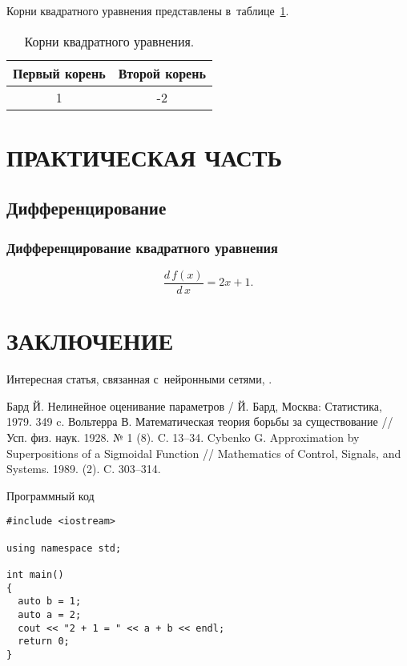 \documentclass[rusmathsym, eqnumwithinsec,amspack, hyperref]{bomgost}
\begin{document}
Корни квадратного уравнения представлены в~таблице~\ref{tab:roots}.
\begin{gosttable}
\begin{table}[H]
\centering
\caption{Корни квадратного уравнения.}
\label{tab:roots}
\begin{tabular}{|c|c|}
\hline 
Первый корень &  Второй корень \\ 
\hline 
1 & -2  \\ 
\hline 
\end{tabular}
\end{table}
\end{gosttable}



\section{ПРАКТИЧЕСКАЯ ЧАСТЬ}
\subsection{Дифференцирование}
\subsubsection{Дифференцирование квадратного уравнения}
\begin{equation}
\dfrac{d\,f(x)}{d\,x} = 2 x + 1.
\end{equation}

\section*{ЗАКЛЮЧЕНИЕ}
Интересная статья, связанная с~нейронными сетями, \cite{Cybenko}.

\begin{thebibliography}{11}
 Бард Й. Нелинейное оценивание параметров / Й. Бард, Москва: Статистика, 1979. 349 c.
 Вольтерра В. Математическая теория борьбы за существование // Усп. физ. наук. 1928. № 1 (8). C. 13–34.
 Cybenko G. Approximation by Superpositions of a Sigmoidal Function // Mathematics of Control, Signals, and Systems. 1989. (2). C. 303–314.
\end{thebibliography}

\appendix

\begin{gostappendix}{Программный код}
\lstset{language=[11]c++,basicstyle=\ttfamily, showstringspaces=false}

\begin{lstlisting}
#include <iostream>

using namespace std;

int main()
{
  auto b = 1;
  auto a = 2;
  cout << "2 + 1 = " << a + b << endl;
  return 0;
}
\end{lstlisting}
\end{gostappendix}
\end{document}
